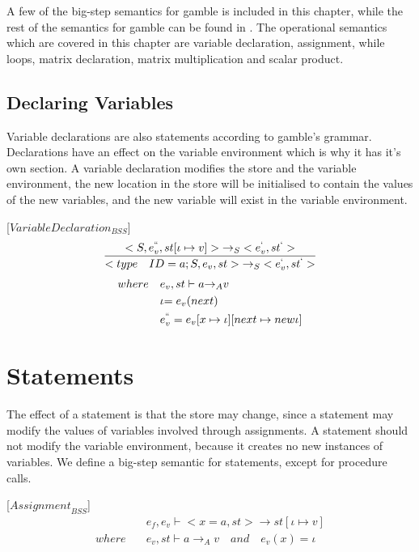 A few of the big-step semantics for \gls{gamble} is included in this chapter, while the rest of the semantics for \gls{gamble} can be found in .
The operational semantics which are covered in this chapter are variable declaration, assignment, while loops, matrix declaration, matrix multiplication and scalar product.

\subsection*{Declaring Variables}
Variable declarations are also statements according to \gls{gamble}'s grammar.
Declarations have an effect on the variable environment which is why it has it's own section.
A variable declaration modifies the store and the variable environment, the new location in the store will be initialised to contain the values of the new variables, and the new variable will exist in the variable environment.\newline

\begin{minipage}{1.0\textwidth}
[${VariableDeclaration}_{BSS}$]
\begin{equation}
	\frac { <S,{ e }_{ v }^{ `` },st[\iota \mapsto v]>{ \rightarrow  }_{ S }<{ e }_{ v }^{ ` },{ st }^{ ` }> }{ <type\quad ID=a;S,{ e }_{ v },st>{ \rightarrow  }_{ S }<{ e }_{ v }^{ ` },{ st }^{ ` }> } 
\end{equation}
\begin{align*}
	where\quad &{ e }_{ v },st\vdash a{ \rightarrow  }_{ A }v \\
	&\iota {= e }_{ v }(next) \\
	&{ e }_{ v }^{ `` }={ e }_{ v }[x\mapsto \iota ][next\mapsto new \iota ]
\end{align*}
\end{minipage}  

\section*{Statements}
The effect of a statement is that the store may change, since a statement may modify the values of variables involved through assignments. 
A statement should not modify the variable environment, because it creates no new instances of variables.
We define a big-step semantic for statements, except for procedure calls.\newline

[${Assignment}_{BSS}$]
\begin{align*}
	&{ e }_{ f },{ e }_{ v }\vdash <x=a,st>\rightarrow st[\iota \mapsto v]\\
	where\quad &{ e }_{ v },st\vdash a{ \rightarrow  }_{ A }v\quad and\quad  { e }_{ v }(x)=\iota 
\end{align*}


